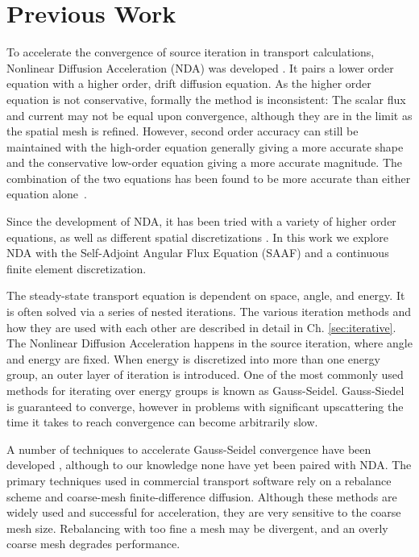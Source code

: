 \section{Previous Work}
To accelerate the convergence of source iteration in transport calculations, Nonlinear Diffusion Acceleration (NDA) was developed \cite{Knoll2011, park-nda}. It pairs a lower order equation with a higher order, drift diffusion equation. As the higher order equation is not conservative, formally the method is inconsistent: The scalar flux and current may not be equal upon convergence, although they are in the limit as the spatial mesh is refined. However, second order accuracy can still be maintained with the high-order equation generally giving a more accurate shape and the conservative low-order equation giving a more accurate magnitude. The combination of the two equations has been found to be more accurate than either equation alone~\cite{morel-holo}. \par
Since the development of NDA, it has been tried with a variety of higher order equations, \cite{morel-holo, Wang2013} as well as different spatial discretizations \cite{morel-holo, Schunert2017}. In this work we explore NDA with the Self-Adjoint Angular Flux Equation (SAAF) \cite{saaf} and a continuous finite element discretization. \par
The steady-state transport equation is dependent on space, angle, and energy. It is often solved via a series of nested iterations. The various iteration methods and how they are used with each other are described in detail in Ch. \ref{sec:iterative}. The Nonlinear Diffusion Acceleration happens in the source iteration, where angle and energy are fixed. When energy is discretized into more than one energy group, an outer layer of iteration is introduced. One of the most commonly used methods for iterating over energy groups is known as Gauss-Seidel. Gauss-Siedel is guaranteed to converge, however in problems with significant upscattering the time it takes to reach convergence can become arbitrarily slow. 
\par
A number of techniques to accelerate Gauss-Seidel convergence have been developed \cite{morel-upscat, evans-upscat}, although to our knowledge none have yet been paired with NDA. The primary techniques used in commercial transport software rely on a rebalance scheme and coarse-mesh finite-difference diffusion. Although these methods are widely used and successful for acceleration, they are very sensitive to the coarse mesh size. Rebalancing with too fine a mesh may be divergent, and an overly coarse mesh degrades performance. \cite{evans-upscat}
